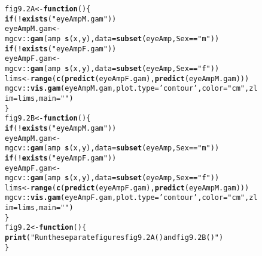 \documentclass[12pt, a4paper,  BCOR=8.25mm, DIV=15]{scrartcl}\usepackage[]{graphicx}\usepackage[]{color}
\makeatletter
\newcommand{\hlstr}[1]{\textcolor[rgb]{0.192,0.494,0.8}{#1}}%
\newcommand{\hlopt}[1]{\textcolor[rgb]{0,0,0}{#1}}%
\newcommand{\hlstd}[1]{\textcolor[rgb]{0.345,0.345,0.345}{#1}}%
\newcommand{\hlkwa}[1]{\textcolor[rgb]{0.161,0.373,0.58}{\textbf{#1}}}%
\newcommand{\hlkwb}[1]{\textcolor[rgb]{0.69,0.353,0.396}{#1}}%
\newcommand{\hlkwc}[1]{\textcolor[rgb]{0.333,0.667,0.333}{#1}}%
\newcommand{\hlkwd}[1]{\textcolor[rgb]{0.737,0.353,0.396}{\textbf{#1}}}%
\newenvironment{kframe}{%
 \def\at@end@of@kframe{}%
 \ifinner\ifhmode%
  \def\at@end@of@kframe{\end{minipage}}%
  \begin{minipage}{\columnwidth}%
 \fi\fi%
 \def\FrameCommand##1{\hskip\@totalleftmargin \hskip-\fboxsep
 \colorbox{shadecolor}{##1}\hskip-\fboxsep
     \hskip-\linewidth \hskip-\@totalleftmargin \hskip\columnwidth}%
 \MakeFramed {\advance\hsize-\width
   \@totalleftmargin\z@ \linewidth\hsize
   \@setminipage}}%
 {\par\unskip\endMakeFramed%
 \at@end@of@kframe}
\newenvironment{knitrout}{}{} %
\makeatother
\begin{document}
\begin{figure}
\begin{knitrout}
\color{fgcolor}\begin{kframe}
\begin{alltt}
\hlstd{fig9.2A} \hlkwb{<-} \hlkwa{function}\hlstd{()\{}
    \hlkwa{if}\hlstd{(}\hlopt{!}\hlkwd{exists}\hlstd{(}\hlstr{"eyeAmpM.gam"}\hlstd{))}
\hlstd{eyeAmpM.gam} \hlkwb{<-} \hlstd{mgcv}\hlopt{::}\hlkwd{gam}\hlstd{(amp} \hlopt{~} \hlkwd{s}\hlstd{(x,y),} \hlkwc{data}\hlstd{=}\hlkwd{subset}\hlstd{(eyeAmp, Sex}\hlopt{==}\hlstr{"m"}\hlstd{))}
        \hlkwa{if}\hlstd{(}\hlopt{!}\hlkwd{exists}\hlstd{(}\hlstr{"eyeAmpF.gam"}\hlstd{))}
\hlstd{eyeAmpF.gam} \hlkwb{<-} \hlstd{mgcv}\hlopt{::}\hlkwd{gam}\hlstd{(amp} \hlopt{~} \hlkwd{s}\hlstd{(x,y),} \hlkwc{data}\hlstd{=}\hlkwd{subset}\hlstd{(eyeAmp, Sex}\hlopt{==}\hlstr{"f"}\hlstd{))}
\hlstd{lims} \hlkwb{<-} \hlkwd{range}\hlstd{(}\hlkwd{c}\hlstd{(}\hlkwd{predict}\hlstd{(eyeAmpF.gam),} \hlkwd{predict}\hlstd{(eyeAmpM.gam)))}
\hlstd{mgcv}\hlopt{::}\hlkwd{vis.gam}\hlstd{(eyeAmpM.gam,} \hlkwc{plot.type}\hlstd{=}\hlstr{'contour'}\hlstd{,} \hlkwc{color}\hlstd{=}\hlstr{"cm"}\hlstd{,} \hlkwc{zlim}\hlstd{=lims,} \hlkwc{main}\hlstd{=}\hlstr{""}\hlstd{)}
\hlstd{\}}
\hlstd{fig9.2B} \hlkwb{<-} \hlkwa{function}\hlstd{()\{}
    \hlkwa{if}\hlstd{(}\hlopt{!}\hlkwd{exists}\hlstd{(}\hlstr{"eyeAmpM.gam"}\hlstd{))}
    \hlstd{eyeAmpM.gam} \hlkwb{<-} \hlstd{mgcv}\hlopt{::}\hlkwd{gam}\hlstd{(amp} \hlopt{~} \hlkwd{s}\hlstd{(x,y),} \hlkwc{data}\hlstd{=}\hlkwd{subset}\hlstd{(eyeAmp, Sex}\hlopt{==}\hlstr{"m"}\hlstd{))}
    \hlkwa{if}\hlstd{(}\hlopt{!}\hlkwd{exists}\hlstd{(}\hlstr{"eyeAmpF.gam"}\hlstd{))}
    \hlstd{eyeAmpF.gam} \hlkwb{<-} \hlstd{mgcv}\hlopt{::}\hlkwd{gam}\hlstd{(amp} \hlopt{~} \hlkwd{s}\hlstd{(x,y),} \hlkwc{data}\hlstd{=}\hlkwd{subset}\hlstd{(eyeAmp, Sex}\hlopt{==}\hlstr{"f"}\hlstd{))}
\hlstd{lims} \hlkwb{<-} \hlkwd{range}\hlstd{(}\hlkwd{c}\hlstd{(}\hlkwd{predict}\hlstd{(eyeAmpF.gam),} \hlkwd{predict}\hlstd{(eyeAmpM.gam)))}
\hlstd{mgcv}\hlopt{::}\hlkwd{vis.gam}\hlstd{(eyeAmpF.gam,} \hlkwc{plot.type}\hlstd{=}\hlstr{'contour'}\hlstd{,} \hlkwc{color}\hlstd{=}\hlstr{"cm"}\hlstd{,} \hlkwc{zlim}\hlstd{=lims,} \hlkwc{main}\hlstd{=}\hlstr{""}\hlstd{)}
\hlstd{\}}
\hlstd{fig9.2} \hlkwb{<-} \hlkwa{function}\hlstd{()\{}
\hlkwd{print}\hlstd{(}\hlstr{"Run the separate figures fig9.2A() and fig9.2B()"}\hlstd{)}
\hlstd{\}}
\end{alltt}
\end{kframe}
\end{knitrout}
\end{figure}
\end{document}
